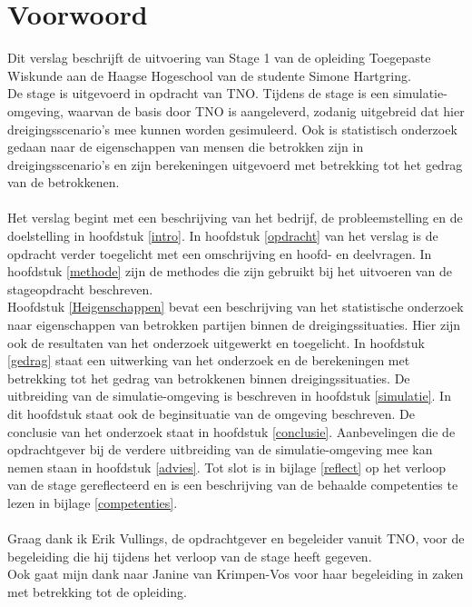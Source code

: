 \documentclass[12pt, letterpaper]{article}
\begin{document}
\section*{Voorwoord}
Dit verslag beschrijft de uitvoering van Stage 1 van de opleiding Toegepaste Wiskunde aan de Haagse Hogeschool van de studente Simone Hartgring. \\
De stage is uitgevoerd in opdracht van TNO. Tijdens de stage is een simulatie-omgeving, waarvan de basis door TNO is aangeleverd, zodanig uitgebreid dat hier dreigingsscenario's mee kunnen worden gesimuleerd. Ook is statistisch onderzoek gedaan naar de eigenschappen van mensen die betrokken zijn in dreigingsscenario's en zijn berekeningen uitgevoerd met betrekking tot het gedrag van de betrokkenen. 
\\ \\
Het verslag begint met een beschrijving van het bedrijf, de probleemstelling en de doelstelling in hoofdstuk \ref{intro}. 
In hoofdstuk \ref{opdracht} van het verslag is de opdracht verder toegelicht met een omschrijving en hoofd- en deelvragen.
In hoofdstuk \ref{methode} zijn de methodes die zijn gebruikt bij het uitvoeren van de stageopdracht beschreven. \\
Hoofdstuk \ref{Heigenschappen} bevat een beschrijving van het statistische onderzoek naar eigenschappen van betrokken partijen binnen de dreigingssituaties. Hier zijn ook de resultaten van het onderzoek uitgewerkt en toegelicht. 
In hoofdstuk \ref{gedrag} staat een uitwerking van het onderzoek en de berekeningen met betrekking tot het gedrag van betrokkenen binnen dreigingssituaties. 
De uitbreiding van de simulatie-omgeving is beschreven in hoofdstuk \ref{simulatie}. In dit hoofdstuk staat ook de beginsituatie van de omgeving beschreven. 
De conclusie van het onderzoek staat in hoofdstuk \ref{conclusie}.
Aanbevelingen die de opdrachtgever bij de verdere uitbreiding van de simulatie-omgeving mee kan nemen staan in hoofdstuk \ref{advies}.
Tot slot is in bijlage \ref{reflect} op het verloop van de stage gereflecteerd en is een beschrijving van de behaalde competenties te lezen in bijlage \ref{competenties}.
\\ \\
Graag dank ik Erik Vullings, de opdrachtgever en begeleider vanuit TNO, voor de begeleiding die hij tijdens het verloop van de stage heeft gegeven. \\
Ook gaat mijn dank naar Janine van Krimpen-Vos voor haar begeleiding in zaken met betrekking tot de opleiding.
\end{document}
